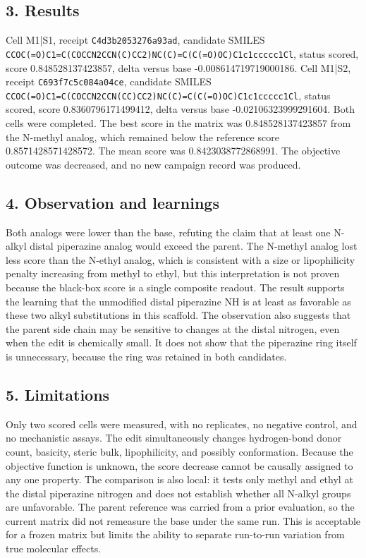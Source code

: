 \subsection*{3. Results}
Cell M1|S1, receipt \nolinkurl{C4d3b2053276a93ad}, candidate SMILES \nolinkurl{CCOC(=O)C1=C(COCCN2CCN(C)CC2)NC(C)=C(C(=O)OC)C1c1ccccc1Cl}, status scored, score 0.848528137423857, delta versus base -0.008614719719000186. Cell M1|S2, receipt \nolinkurl{C693f7c5c084a04ce}, candidate SMILES \nolinkurl{CCOC(=O)C1=C(COCCN2CCN(CC)CC2)NC(C)=C(C(=O)OC)C1c1ccccc1Cl}, status scored, score 0.8360796171499412, delta versus base -0.02106323999291604. Both cells were completed. The best score in the matrix was 0.848528137423857 from the N-methyl analog, which remained below the reference score 0.8571428571428572. The mean score was 0.8423038772868991. The objective outcome was decreased, and no new campaign record was produced.

\subsection*{4. Observation and learnings}
Both analogs were lower than the base, refuting the claim that at least one N-alkyl distal piperazine analog would exceed the parent. The N-methyl analog lost less score than the N-ethyl analog, which is consistent with a size or lipophilicity penalty increasing from methyl to ethyl, but this interpretation is not proven because the black-box score is a single composite readout. The result supports the learning that the unmodified distal piperazine NH is at least as favorable as these two alkyl substitutions in this scaffold. The observation also suggests that the parent side chain may be sensitive to changes at the distal nitrogen, even when the edit is chemically small. It does not show that the piperazine ring itself is unnecessary, because the ring was retained in both candidates.

\subsection*{5. Limitations}
Only two scored cells were measured, with no replicates, no negative control, and no mechanistic assays. The edit simultaneously changes hydrogen-bond donor count, basicity, steric bulk, lipophilicity, and possibly conformation. Because the objective function is unknown, the score decrease cannot be causally assigned to any one property. The comparison is also local: it tests only methyl and ethyl at the distal piperazine nitrogen and does not establish whether all N-alkyl groups are unfavorable. The parent reference was carried from a prior evaluation, so the current matrix did not remeasure the base under the same run. This is acceptable for a frozen matrix but limits the ability to separate run-to-run variation from true molecular effects.

